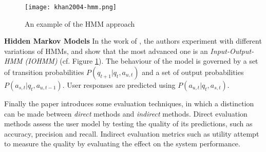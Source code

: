 \begin{figure}[h]
  \centering
  \texttt{[image: khan2004-hmm.png]}\\
  \caption{An example of the HMM approach}\label{fig:khan04-hmm}
\end{figure}

\textbf{Hidden Markov Models} In the work of \cite{Cuayahuitl2005}, the authors experiment with different variations of HMMs, and show that the most advanced one is an \emph{Input-Output-HMM (IOHMM)}  (cf. Figure \ref{fig:khan04-hmm}). The behaviour of the model is governed by a set of transition probabilities $P(q_{t+1} | q_t, a_{u,t})$ and a set of output probabilities $P(a_{s,t} | q_t, a_{u, t-1})$. User responses are predicted using $P(a_{u,t} | q_t, a_{s,t})$.

Finally the paper introduces some evaluation techniques, in which a distinction can be made between \emph{direct} methods and \emph{indirect} methods. Direct evaluation methods assess the user model by testing the quality of its predictions, such as accuracy, precision and recall. Indirect evaluation metrics such as utility attempt to measure the quality by evaluating the effect on the system performance.
